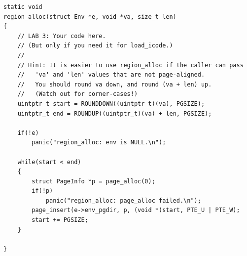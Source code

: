 \documentclass[12pt, letterpaper]{report}
\begin{document}
\lstset{style=CStyle}
\setmainfont{Consolas}
\begin{lstlisting}
static void
region_alloc(struct Env *e, void *va, size_t len)
{
    // LAB 3: Your code here.
    // (But only if you need it for load_icode.)
    //
    // Hint: It is easier to use region_alloc if the caller can pass
    //   'va' and 'len' values that are not page-aligned.
    //   You should round va down, and round (va + len) up.
    //   (Watch out for corner-cases!)
    uintptr_t start = ROUNDDOWN((uintptr_t)(va), PGSIZE);
    uintptr_t end = ROUNDUP((uintptr_t)(va) + len, PGSIZE);

    if(!e)
        panic("region_alloc: env is NULL.\n");

    while(start < end)
    {
        struct PageInfo *p = page_alloc(0);
        if(!p)
            panic("region_alloc: page_alloc failed.\n");
        page_insert(e->env_pgdir, p, (void *)start, PTE_U | PTE_W);
        start += PGSIZE;
    }

}
\end{lstlisting}
\setmainfont{Times New Roman}

\newpage
\end{document}

